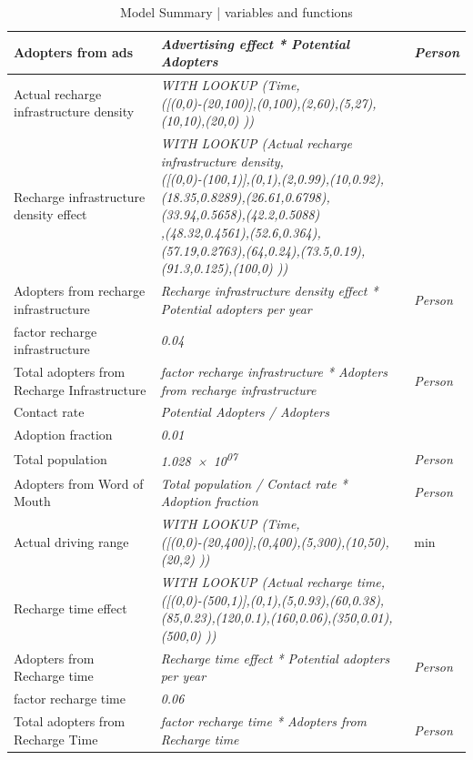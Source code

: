 \begin{table}[!htpb]
\begin{adjustbox}{width=0.96\textwidth}
\begin{tabular}{|l|l|l|}
   Adopters from ads & \textit{Advertising effect * Potential Adopters} & \textit{Person} \\\hline
   Actual recharge infrastructure density & \makecell[l]{\textit{WITH LOOKUP (Time,} \\ \textit{([(0,0)-(20,100)],(0,100),(2,60),(5,27),(10,10),(20,0) ))}} & \\\hline
   Recharge infrastructure density effect & \makecell[l]{\textit{WITH LOOKUP (Actual recharge infrastructure density,} \\ \textit{([(0,0)-(100,1)],(0,1),(2,0.99),(10,0.92),(18.35,0.8289),(26.61,0.6798),(33.94,0.5658),(42.2,0.5088)} \\ \textit{,(48.32,0.4561),(52.6,0.364),(57.19,0.2763),(64,0.24),(73.5,0.19),(91.3,0.125),(100,0) ))}} & \\\hline
   Adopters from recharge infrastructure & \textit{Recharge infrastructure density effect * Potential adopters per year} & \textit{Person} \\\hline
   factor recharge infrastructure & \textit{0.04} & \\\hline
   Total adopters from Recharge Infrastructure & \textit{factor recharge infrastructure * Adopters from recharge infrastructure} & \textit{Person} \\\hline
   Contact rate & \textit{Potential Adopters / Adopters} & \\\hline
   Adoption fraction & \textit{0.01} & \\\hline
   Total population & \textit{\num{1.028e+07}} & \textit{Person} \\\hline
   Adopters from Word of Mouth & \textit{Total population / Contact rate * Adoption fraction} & \textit{Person} \\\hline
   Actual driving range & \makecell[l]{\textit{WITH LOOKUP (Time,} \\
   \textit{([(0,0)-(20,400)],(0,400),(5,300),(10,50),(20,2) ))}} & min \\\hline
   Recharge time effect & \makecell[l]{\textit{WITH LOOKUP (Actual recharge time,} \\ \textit{([(0,0)-(500,1)],(0,1),(5,0.93),(60,0.38),(85,0.23),(120,0.1),(160,0.06),(350,0.01),(500,0) ))}} & \\\hline
   Adopters from Recharge time & \textit{Recharge time effect * Potential adopters per year} & \textit{Person} \\\hline
   factor recharge time & \textit{0.06} & \\\hline
   Total adopters from Recharge Time & \textit{factor recharge time * Adopters from Recharge time} & \textit{Person} \\\hline
   \end{tabular}
   \end{adjustbox}
   \caption{Model Summary | variables and functions}
   \label{table:model-summary}
\end{table}

\clearpage